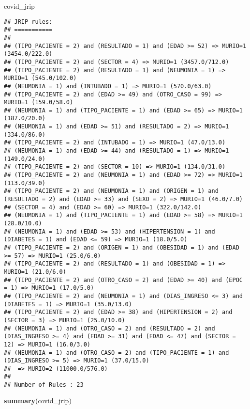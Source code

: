 \documentclass[]{article}
\newenvironment{Shaded}{\begin{snugshade}}{\end{snugshade}}
\newcommand{\KeywordTok}[1]{\textcolor[rgb]{0.13,0.29,0.53}{\textbf{#1}}}
\newcommand{\NormalTok}[1]{#1}
\begin{document}
\begin{Shaded}
\begin{Highlighting}[]
\NormalTok{covid_jrip}
\end{Highlighting}
\end{Shaded}

\begin{verbatim}
## JRIP rules:
## ===========
## 
## (TIPO_PACIENTE = 2) and (RESULTADO = 1) and (EDAD >= 52) => MURIO=1 (3454.0/222.0)
## (TIPO_PACIENTE = 2) and (SECTOR = 4) => MURIO=1 (3457.0/712.0)
## (TIPO_PACIENTE = 2) and (RESULTADO = 1) and (NEUMONIA = 1) => MURIO=1 (545.0/102.0)
## (NEUMONIA = 1) and (INTUBADO = 1) => MURIO=1 (570.0/63.0)
## (TIPO_PACIENTE = 2) and (EDAD >= 49) and (OTRO_CASO = 99) => MURIO=1 (159.0/58.0)
## (NEUMONIA = 1) and (TIPO_PACIENTE = 1) and (EDAD >= 65) => MURIO=1 (187.0/20.0)
## (NEUMONIA = 1) and (EDAD >= 51) and (RESULTADO = 2) => MURIO=1 (334.0/86.0)
## (TIPO_PACIENTE = 2) and (INTUBADO = 1) => MURIO=1 (47.0/13.0)
## (NEUMONIA = 1) and (EDAD >= 44) and (RESULTADO = 1) => MURIO=1 (149.0/24.0)
## (TIPO_PACIENTE = 2) and (SECTOR = 10) => MURIO=1 (134.0/31.0)
## (TIPO_PACIENTE = 2) and (NEUMONIA = 1) and (EDAD >= 72) => MURIO=1 (113.0/39.0)
## (TIPO_PACIENTE = 2) and (NEUMONIA = 1) and (ORIGEN = 1) and (RESULTADO = 2) and (EDAD >= 33) and (SEXO = 2) => MURIO=1 (46.0/7.0)
## (SECTOR = 4) and (EDAD >= 60) => MURIO=1 (322.0/142.0)
## (NEUMONIA = 1) and (TIPO_PACIENTE = 1) and (EDAD >= 58) => MURIO=1 (28.0/10.0)
## (NEUMONIA = 1) and (EDAD >= 53) and (HIPERTENSION = 1) and (DIABETES = 1) and (EDAD <= 59) => MURIO=1 (18.0/5.0)
## (TIPO_PACIENTE = 2) and (ORIGEN = 1) and (OBESIDAD = 1) and (EDAD >= 57) => MURIO=1 (25.0/6.0)
## (TIPO_PACIENTE = 2) and (RESULTADO = 1) and (OBESIDAD = 1) => MURIO=1 (21.0/6.0)
## (TIPO_PACIENTE = 2) and (OTRO_CASO = 2) and (EDAD >= 40) and (EPOC = 1) => MURIO=1 (17.0/5.0)
## (TIPO_PACIENTE = 2) and (NEUMONIA = 1) and (DIAS_INGRESO <= 3) and (DIABETES = 1) => MURIO=1 (35.0/13.0)
## (TIPO_PACIENTE = 2) and (EDAD >= 38) and (HIPERTENSION = 2) and (SECTOR = 3) => MURIO=1 (25.0/10.0)
## (NEUMONIA = 1) and (OTRO_CASO = 2) and (RESULTADO = 2) and (DIAS_INGRESO >= 4) and (EDAD >= 31) and (EDAD <= 47) and (SECTOR = 12) => MURIO=1 (16.0/3.0)
## (NEUMONIA = 1) and (OTRO_CASO = 2) and (TIPO_PACIENTE = 1) and (DIAS_INGRESO >= 5) => MURIO=1 (37.0/15.0)
##  => MURIO=2 (11000.0/576.0)
## 
## Number of Rules : 23
\end{verbatim}

\begin{Shaded}
\begin{Highlighting}[]
\KeywordTok{summary}\NormalTok{(covid_jrip)}
\end{Highlighting}
\end{Shaded}
\end{document}
